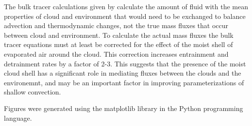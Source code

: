 \documentclass[12pt]{article}
\begin{document}
The bulk tracer calculations given by \cite{Siebesma1995} calculate the amount
of fluid with the mean properties of cloud and environment that would need to
be exchanged to balance advection and thermodynamic changes, not the true mass
fluxes that occur between cloud and environment.  To calculate the actual mass
fluxes the bulk tracer equations must at least be corrected for the effect of
the moist shell of evaporated air around the cloud.  This correction increases
entrainment and detrainment rates by a factor of 2-3.  This suggests that the
presence of the moist cloud shell has a significant role in mediating fluxes
between the clouds and the environemnt, and may be an important factor in 
improving parameterizations of shallow convection.




\begin{acknowledgment}
Figures were generated using the matplotlib library in the Python
programming language.
\end{acknowledgment}




\end{document}
